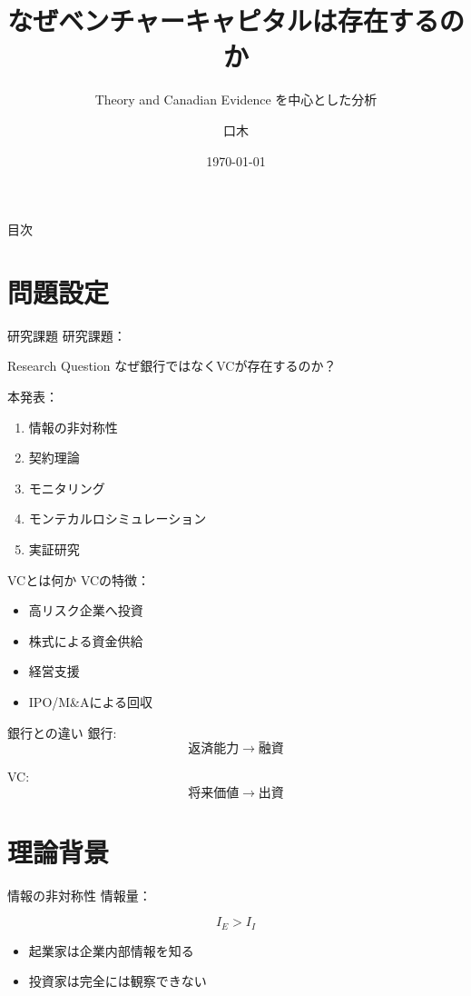 \documentclass[aspectratio=169]{beamer}
\title{なぜベンチャーキャピタルは存在するのか}
\subtitle{Theory and Canadian Evidence を中心とした分析}
\author{口木}
\date{\today}
\begin{document}
\begin{frame}\titlepage\end{frame}

\begin{frame}{目次}
\tableofcontents
\end{frame}

\section{問題設定}

\begin{frame}{研究課題}
研究課題：
\begin{block}{Research Question}
なぜ銀行ではなくVCが存在するのか？
\end{block}

本発表：
\begin{enumerate}
\item 情報の非対称性
\item 契約理論
\item モニタリング
\item モンテカルロシミュレーション
\item 実証研究
\end{enumerate}
\end{frame}

\begin{frame}{VCとは何か}
VCの特徴：
\begin{itemize}
\item 高リスク企業へ投資
\item 株式による資金供給
\item 経営支援
\item IPO/M\&Aによる回収
\end{itemize}
\end{frame}

\begin{frame}{銀行との違い}
銀行:
\[
返済能力 \rightarrow 融資
\]

VC: 
\[
将来価値 \rightarrow 出資
\]

\end{frame}

\section{理論背景}

\begin{frame}{情報の非対称性}
情報量：

\[
I_E>I_I
\]

\begin{itemize}
\item 起業家は企業内部情報を知る
\item 投資家は完全には観察できない
\end{itemize}
\end{frame}
\end{document}
